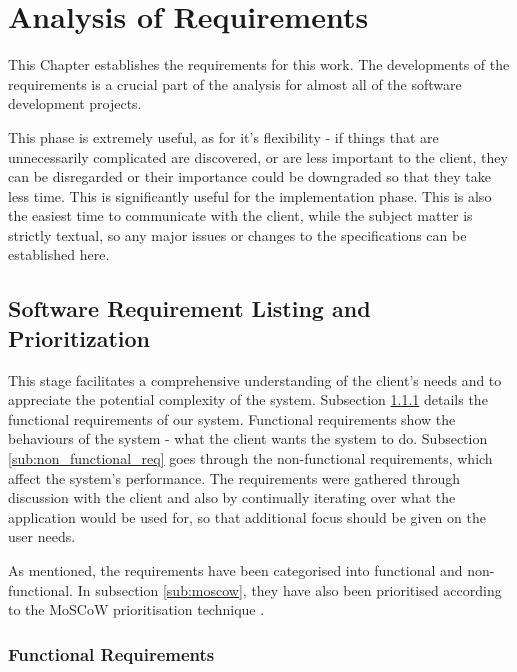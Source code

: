 \chapter{Analysis of Requirements}
\label{chapterlabel3}


This Chapter establishes the requirements for this work. The developments of the requirements is a crucial part of the analysis for almost all of the software development projects.

This phase is extremely useful, as for it's flexibility - if things that are unnecessarily complicated are discovered, or are less important to the client, they can be disregarded  or their importance could be downgraded so that they take less time. This is significantly useful for the implementation phase. This is also the easiest time to communicate with the client, while the subject matter is strictly textual, so any major issues or changes to the specifications can be established here.



\section{Software Requirement Listing and Prioritization}
\label{sec:softreqlistandprior} 

This stage facilitates a comprehensive understanding of the client's needs and to appreciate the potential complexity of the system. Subsection \ref{sub:functional_req} details the functional requirements of our system.  Functional requirements show the behaviours of the system - what the client wants the system to do.  Subsection \ref{sub:non_functional_req} goes through the non-functional requirements, which affect the system's performance. 
The requirements were gathered through discussion with the client and also by continually iterating over what the application would be used for, so that additional focus should be given on the user needs.


 As mentioned, the requirements have been categorised into functional and non-functional. In subsection \ref{sub:moscow}, they have also been prioritised according to the MoSCoW prioritisation technique \cite{cleggbarker1994}.
 


\subsection{Functional Requirements}
\label{sub:functional_req}

